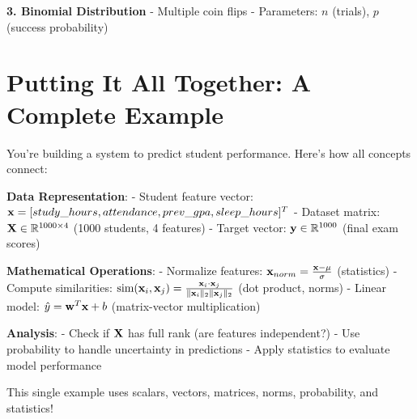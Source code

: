 \documentclass{article}
\newcounter{example}
\begin{document}
\textbf{3. Binomial Distribution}
- Multiple coin flips
- Parameters: $n$ (trials), $p$ (success probability)

\begin{center}
\end{center}

\section{Putting It All Together: A Complete Example}

\begin{tcolorbox}[colback=gray!5!white,colframe=gray!75!black,title=Example \stepcounter{example}\#\theexample: Student Performance Analysis System]

You're building a system to predict student performance. Here's how all concepts connect:

\textbf{Data Representation}:
- Student feature vector: $\mathbf{x} = [study\_hours, attendance, prev\_gpa, sleep\_hours]^T$
- Dataset matrix: $\mathbf{X} \in \mathbb{R}^{1000 \times 4}$ (1000 students, 4 features)
- Target vector: $\mathbf{y} \in \mathbb{R}^{1000}$ (final exam scores)

\textbf{Mathematical Operations}:
- Normalize features: $\mathbf{x}_{norm} = \frac{\mathbf{x} - \mu}{\sigma}$ (statistics)
- Compute similarities: $\text{sim}(\mathbf{x}_i, \mathbf{x}_j) = \frac{\mathbf{x}_i \cdot \mathbf{x}_j}{\|\mathbf{x}_i\|_2 \|\mathbf{x}_j\|_2}$ (dot product, norms)
- Linear model: $\hat{y} = \mathbf{w}^T \mathbf{x} + b$ (matrix-vector multiplication)

\textbf{Analysis}:
- Check if $\mathbf{X}$ has full rank (are features independent?)
- Use probability to handle uncertainty in predictions
- Apply statistics to evaluate model performance

This single example uses scalars, vectors, matrices, norms, probability, and statistics!
\end{tcolorbox}
\end{document}
